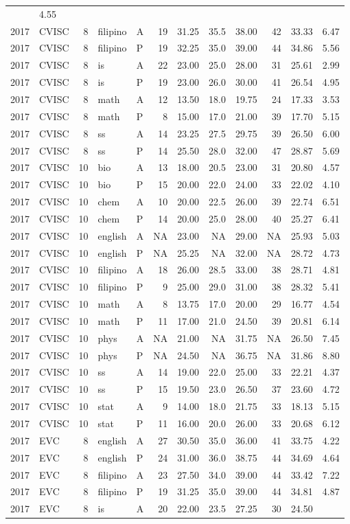 \documentclass[]{article}
\begin{document}
\begin{longtable}[]{@{}rlrllrrrrrrr@{}}
& 4.55\tabularnewline
2017 & CVISC & 8 & filipino & A & 19 & 31.25 & 35.5 & 38.00 & 42 & 33.33
& 6.47\tabularnewline
2017 & CVISC & 8 & filipino & P & 19 & 32.25 & 35.0 & 39.00 & 44 & 34.86
& 5.56\tabularnewline
2017 & CVISC & 8 & is & A & 22 & 23.00 & 25.0 & 28.00 & 31 & 25.61 &
2.99\tabularnewline
2017 & CVISC & 8 & is & P & 19 & 23.00 & 26.0 & 30.00 & 41 & 26.54 &
4.95\tabularnewline
2017 & CVISC & 8 & math & A & 12 & 13.50 & 18.0 & 19.75 & 24 & 17.33 &
3.53\tabularnewline
2017 & CVISC & 8 & math & P & 8 & 15.00 & 17.0 & 21.00 & 39 & 17.70 &
5.15\tabularnewline
2017 & CVISC & 8 & ss & A & 14 & 23.25 & 27.5 & 29.75 & 39 & 26.50 &
6.00\tabularnewline
2017 & CVISC & 8 & ss & P & 14 & 25.50 & 28.0 & 32.00 & 47 & 28.87 &
5.69\tabularnewline
2017 & CVISC & 10 & bio & A & 13 & 18.00 & 20.5 & 23.00 & 31 & 20.80 &
4.57\tabularnewline
2017 & CVISC & 10 & bio & P & 15 & 20.00 & 22.0 & 24.00 & 33 & 22.02 &
4.10\tabularnewline
2017 & CVISC & 10 & chem & A & 10 & 20.00 & 22.5 & 26.00 & 39 & 22.74 &
6.51\tabularnewline
2017 & CVISC & 10 & chem & P & 14 & 20.00 & 25.0 & 28.00 & 40 & 25.27 &
6.41\tabularnewline
2017 & CVISC & 10 & english & A & NA & 23.00 & NA & 29.00 & NA & 25.93 &
5.03\tabularnewline
2017 & CVISC & 10 & english & P & NA & 25.25 & NA & 32.00 & NA & 28.72 &
4.73\tabularnewline
2017 & CVISC & 10 & filipino & A & 18 & 26.00 & 28.5 & 33.00 & 38 &
28.71 & 4.81\tabularnewline
2017 & CVISC & 10 & filipino & P & 9 & 25.00 & 29.0 & 31.00 & 38 & 28.32
& 5.41\tabularnewline
2017 & CVISC & 10 & math & A & 8 & 13.75 & 17.0 & 20.00 & 29 & 16.77 &
4.54\tabularnewline
2017 & CVISC & 10 & math & P & 11 & 17.00 & 21.0 & 24.50 & 39 & 20.81 &
6.14\tabularnewline
2017 & CVISC & 10 & phys & A & NA & 21.00 & NA & 31.75 & NA & 26.50 &
7.45\tabularnewline
2017 & CVISC & 10 & phys & P & NA & 24.50 & NA & 36.75 & NA & 31.86 &
8.80\tabularnewline
2017 & CVISC & 10 & ss & A & 14 & 19.00 & 22.0 & 25.00 & 33 & 22.21 &
4.37\tabularnewline
2017 & CVISC & 10 & ss & P & 15 & 19.50 & 23.0 & 26.50 & 37 & 23.60 &
4.72\tabularnewline
2017 & CVISC & 10 & stat & A & 9 & 14.00 & 18.0 & 21.75 & 33 & 18.13 &
5.15\tabularnewline
2017 & CVISC & 10 & stat & P & 11 & 16.00 & 20.0 & 26.00 & 33 & 20.68 &
6.12\tabularnewline
2017 & EVC & 8 & english & A & 27 & 30.50 & 35.0 & 36.00 & 41 & 33.75 &
4.22\tabularnewline
2017 & EVC & 8 & english & P & 24 & 31.00 & 36.0 & 38.75 & 44 & 34.69 &
4.64\tabularnewline
2017 & EVC & 8 & filipino & A & 23 & 27.50 & 34.0 & 39.00 & 44 & 33.42 &
7.22\tabularnewline
2017 & EVC & 8 & filipino & P & 19 & 31.25 & 35.0 & 39.00 & 44 & 34.81 &
4.87\tabularnewline
2017 & EVC & 8 & is & A & 20 & 22.00 & 23.5 & 27.25 & 30 & 24.50 &

\end{longtable}
\end{document}
